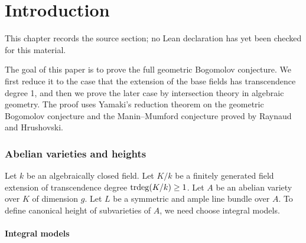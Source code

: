 \chapter{Introduction}
\label{geometric-bogomolov-conjecture-arbitrary-characteristics-chapter-01}

\begin{remark}
\label{geometric-bogomolov-conjecture-arbitrary-characteristics-chapter-01-source}
This chapter records the source section; no Lean declaration has yet been checked for this material.
\notready
\end{remark}

The goal of this paper is to prove the full geometric Bogomolov conjecture.
We first reduce it to the case that the extension of the base fields has transcendence degree 1, and then we prove the later case by intersection theory in algebraic geometry.
The proof uses Yamaki's reduction theorem on the geometric Bogomolov conjecture and the Manin--Mumford conjecture proved by Raynaud and Hrushovski.

\subsection{Abelian varieties and heights}\label{par:1.1.1}

Let $k$ be an algebraically closed field.
Let $K/k$ be a finitely generated field extension of transcendence degree ${\mathrm{trdeg}}(K/k)\geq 1$.
Let $A$ be an abelian variety over $K$ of dimension $g$.
Let $L$ be a symmetric and ample line bundle over $A$.
To define canonical height of subvarieties of $A$, we need choose integral models.

\subsubsection{Integral models} \label{sectioncanheight}

